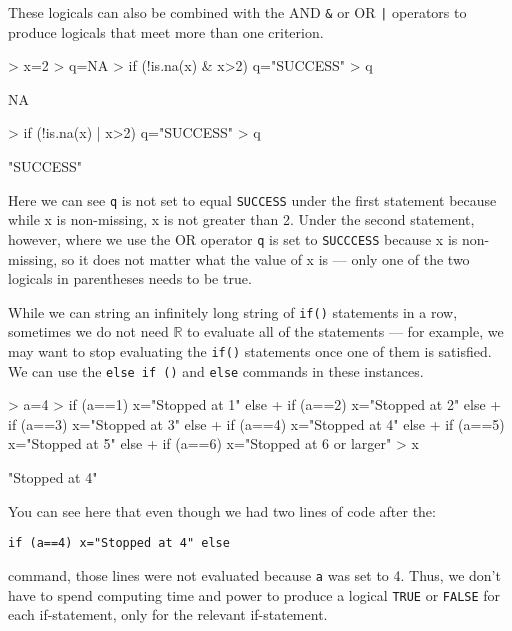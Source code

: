 \documentclass[12pt]{article}
\begin{document}
These logicals can also be combined with the AND \verb|&| or OR \verb`|` operators to produce logicals that meet more than one criterion.
\begin{Schunk}
\begin{Sinput}
> x=2
> q=NA
> if (!is.na(x) & x>2) q="SUCCESS"
> q
\end{Sinput}
\begin{Soutput}
[1] NA
\end{Soutput}
\begin{Sinput}
> if (!is.na(x) | x>2) q="SUCCESS"
> q
\end{Sinput}
\begin{Soutput}
[1] "SUCCESS"
\end{Soutput}
\end{Schunk}
Here we can see \verb|q| is not set to equal \verb|SUCCESS| under the first statement because while x is non-missing, x is not greater than 2. Under the second statement, however, where we use the OR operator \verb|q| is set to \verb|SUCCCESS| because x is non-missing, so it does not matter what the value of x is --- only one of the two logicals in parentheses needs to be true.

While we can string an infinitely long string of \verb|if()| statements in a row, sometimes we do not need $\mathbb{R}$ to evaluate all of the statements --- for example, we may want to stop evaluating the \verb|if()| statements once one of them is satisfied. We can use the \verb|else if ()| and \verb|else| commands in these instances.
\begin{Schunk}
\begin{Sinput}
> a=4
> if (a==1) x="Stopped at 1" else
+ if (a==2) x="Stopped at 2" else
+ if (a==3) x="Stopped at 3" else
+ if (a==4) x="Stopped at 4" else
+ if (a==5) x="Stopped at 5" else
+ if (a==6) x="Stopped at 6 or larger"
> x
\end{Sinput}
\begin{Soutput}
[1] "Stopped at 4"
\end{Soutput}
\end{Schunk}
You can see here that even though we had two lines of code after the:
\begin{verbatim}
if (a==4) x="Stopped at 4" else
\end{verbatim}
command, those lines were not evaluated because \verb|a| was set to 4. Thus, we don't have to spend computing time and power to produce a logical \verb|TRUE| or \verb|FALSE| for each if-statement, only for the relevant if-statement.
\end{document}
